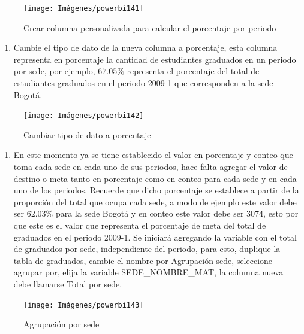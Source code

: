 \documentclass[
]{book}
\providecommand{\tightlist}{%
  \setlength{\itemsep}{0pt}\setlength{\parskip}{0pt}}
\begin{document}
\begin{figure}

{\centering \texttt{[image: Imágenes/powerbi141]} 

}

\caption{Crear columna personalizada para calcular el porcentaje por periodo}\label{fig:columnapersonalizadadeporcentajeperiodo-fig}
\end{figure}

\begin{enumerate}
\def\labelenumi{\arabic{enumi}.}
\setcounter{enumi}{9}
\tightlist
\item
  Cambie el tipo de dato de la nueva columna a porcentaje, esta columna representa en porcentaje la cantidad de estudiantes graduados en un periodo por sede, por ejemplo, \(67.05\%\) representa el porcentaje del total de estudiantes graduados en el periodo 2009-1 que corresponden a la sede Bogotá.
\end{enumerate}

\begin{figure}

{\centering \texttt{[image: Imágenes/powerbi142]} 

}

\caption{Cambiar tipo de dato a porcentaje}\label{fig:columnapersonalizadadeporcentajeperiodocambiaraporcetaje-fig}
\end{figure}

\begin{enumerate}
\def\labelenumi{\arabic{enumi}.}
\setcounter{enumi}{10}
\tightlist
\item
  En este momento ya se tiene establecido el valor en porcentaje y conteo que toma cada sede en cada uno de sus periodos, hace falta agregar el valor de destino o meta tanto en porcentaje como en conteo para cada sede y en cada uno de los periodos. Recuerde que dicho porcentaje se establece a partir de la proporción del total que ocupa cada sede, a modo de ejemplo este valor debe ser \(62.03\%\) para la sede Bogotá y en conteo este valor debe ser 3074, esto por que este es el valor que representa el porcentaje de meta del total de graduados en el periodo 2009-1. Se iniciará agregando la variable con el total de graduados por sede, independiente del periodo, para esto, duplique la tabla de graduados, cambie el nombre por Agrupación sede, seleccione agrupar por, elija la variable SEDE\_NOMBRE\_MAT, la columna nueva debe llamarse Total por sede.
\end{enumerate}

\begin{figure}

{\centering \texttt{[image: Imágenes/powerbi143]} 

}

\caption{Agrupación por sede}\label{fig:agrupacionporsede-fig}
\end{figure}
\end{document}
